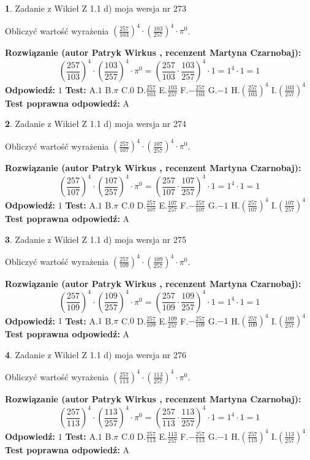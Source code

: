 \documentclass[12pt, a4paper]{article}
\theoremstyle{definition} %
\newtheorem{zad}{}
\newcommand{\zadStart}[1]{\begin{zad}#1\newline}
\newcommand{\zadStop}{\end{zad}}
\newcommand{\rozwStart}[2]{\noindent \textbf{Rozwiązanie (autor #1 , recenzent #2): }\newline}
\newcommand{\rozwStop}{\newline}
\newcommand{\odpStart}{\noindent \textbf{Odpowiedź:}\newline}
\newcommand{\odpStop}{\newline}
\newcommand{\testStart}{\noindent \textbf{Test:}\newline}
\newcommand{\testStop}{\newline}
\newcommand{\kluczStart}{\noindent \textbf{Test poprawna odpowiedź:}\newline}
\newcommand{\kluczStop}{\newline}
\begin{document}
\zadStart{Zadanie z Wikieł Z 1.1 d) moja wersja nr 273}

Obliczyć wartość wyrażenia $(\frac{257}{103})^{4} \cdot (\frac{103}{257})^{4} \cdot \pi^{0}$.
\zadStop
\rozwStart{Patryk Wirkus}{Martyna Czarnobaj}
$$(\frac{257}{103})^{4} \cdot (\frac{103}{257})^{4} \cdot \pi^{0} = (\frac{257}{103} \cdot \frac{103}{257})^{4} \cdot 1 = 1^{4} \cdot 1 = 1$$
\rozwStop
\odpStart
$1$
\odpStop
\testStart
A.$1$ B.$\pi$ C.$0$ D.$\frac{257}{103}$ E.$\frac{103}{257}$
F.$-\frac{257}{103}$ G.$-1$
H.$(\frac{257}{103})^{4}$
I.$(\frac{103}{257})^{4}$
\testStop
\kluczStart
A
\kluczStop



\zadStart{Zadanie z Wikieł Z 1.1 d) moja wersja nr 274}

Obliczyć wartość wyrażenia $(\frac{257}{107})^{4} \cdot (\frac{107}{257})^{4} \cdot \pi^{0}$.
\zadStop
\rozwStart{Patryk Wirkus}{Martyna Czarnobaj}
$$(\frac{257}{107})^{4} \cdot (\frac{107}{257})^{4} \cdot \pi^{0} = (\frac{257}{107} \cdot \frac{107}{257})^{4} \cdot 1 = 1^{4} \cdot 1 = 1$$
\rozwStop
\odpStart
$1$
\odpStop
\testStart
A.$1$ B.$\pi$ C.$0$ D.$\frac{257}{107}$ E.$\frac{107}{257}$
F.$-\frac{257}{107}$ G.$-1$
H.$(\frac{257}{107})^{4}$
I.$(\frac{107}{257})^{4}$
\testStop
\kluczStart
A
\kluczStop



\zadStart{Zadanie z Wikieł Z 1.1 d) moja wersja nr 275}

Obliczyć wartość wyrażenia $(\frac{257}{109})^{4} \cdot (\frac{109}{257})^{4} \cdot \pi^{0}$.
\zadStop
\rozwStart{Patryk Wirkus}{Martyna Czarnobaj}
$$(\frac{257}{109})^{4} \cdot (\frac{109}{257})^{4} \cdot \pi^{0} = (\frac{257}{109} \cdot \frac{109}{257})^{4} \cdot 1 = 1^{4} \cdot 1 = 1$$
\rozwStop
\odpStart
$1$
\odpStop
\testStart
A.$1$ B.$\pi$ C.$0$ D.$\frac{257}{109}$ E.$\frac{109}{257}$
F.$-\frac{257}{109}$ G.$-1$
H.$(\frac{257}{109})^{4}$
I.$(\frac{109}{257})^{4}$
\testStop
\kluczStart
A
\kluczStop



\zadStart{Zadanie z Wikieł Z 1.1 d) moja wersja nr 276}

Obliczyć wartość wyrażenia $(\frac{257}{113})^{4} \cdot (\frac{113}{257})^{4} \cdot \pi^{0}$.
\zadStop
\rozwStart{Patryk Wirkus}{Martyna Czarnobaj}
$$(\frac{257}{113})^{4} \cdot (\frac{113}{257})^{4} \cdot \pi^{0} = (\frac{257}{113} \cdot \frac{113}{257})^{4} \cdot 1 = 1^{4} \cdot 1 = 1$$
\rozwStop
\odpStart
$1$
\odpStop
\testStart
A.$1$ B.$\pi$ C.$0$ D.$\frac{257}{113}$ E.$\frac{113}{257}$
F.$-\frac{257}{113}$ G.$-1$
H.$(\frac{257}{113})^{4}$
I.$(\frac{113}{257})^{4}$
\testStop
\kluczStart
A
\kluczStop
\end{document}
